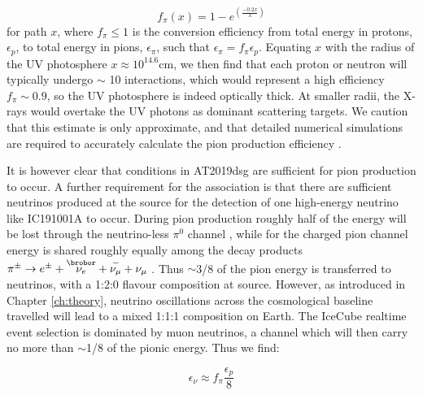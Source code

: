 \begin{equation}
f_{\pi}(x) = 1 - e^{\left( \frac{-0.2x}{\lambda} \right)}
\end{equation} for path $x$, where $f_{\pi} \leq1$ is the conversion efficiency from total energy in protons, $\epsilon_{p}$, to total energy in pions, $\epsilon_{\pi}$, such that $\epsilon_{\pi} = f_{\pi} \epsilon_{p}$. Equating $x$ with the radius of the UV photosphere $x \approx 10^{14.6}$cm, we then find that each proton or neutron will typically undergo $\sim$ 10 interactions, which would represent a high efficiency $f_{\pi} \sim 0.9$, so the UV photosphere is indeed optically thick. At smaller radii, the X-rays would overtake the UV photons as dominant scattering targets. We caution that this estimate is only approximate, and that detailed numerical simulations are required to accurately calculate the pion production efficiency .


It is however clear that conditions in AT2019dsg are sufficient for pion production to occur. A further requirement for the association is that there are sufficient neutrinos produced at the source for the detection of one high-energy neutrino like IC191001A to occur. During pion production roughly half of the energy will be lost through the neutrino-less $\pi^{0}$ channel \cite{2010ApJ...721..630H}, while for the charged pion channel energy is shared roughly equally among the decay products $\pi^{\pm} \rightarrow e^{\pm} + \overset{\brobor}{\nu_{e}} + \overset{-}{\nu_{\mu}} + \nu_{\mu}$ . Thus $\sim$3/8 of the pion energy is transferred to neutrinos, with a 1:2:0 flavour composition at source. However, as introduced in Chapter \ref{ch:theory}, neutrino oscillations across the cosmological baseline travelled will lead to a mixed 1:1:1 composition on Earth. The IceCube realtime event selection is dominated by muon neutrinos, a channel which will then carry no more than $\sim$1/8 of the pionic energy. Thus we find:

\begin{equation}
\epsilon_{\nu} \approx f_{\pi} \frac{\epsilon_{p}}{8}
\label{eq:pion_eff}
\end{equation} 

